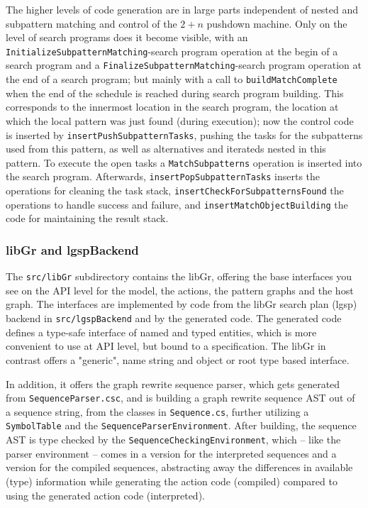 The higher levels of code generation are in large parts independent of nested and subpattern matching and control of the $2+n$ pushdown machine.
Only on the level of search programs does it become visible,  
with an \texttt{Initialize\-Subpattern\-Matching}-search program operation at the begin of a search program
and a \texttt{Finalize\-Subpattern\-Matching}-search program operation at the end of a search program;
but mainly with a call to \texttt{build\-Match\-Complete} when the end of the schedule is reached during search program building.
This corresponds to the innermost location in the search program,
the location at which the local pattern was just found (during execution);
now the control code is inserted by \texttt{insert\-Push\-Subpattern\-Tasks},
pushing the tasks for the subpatterns used from this pattern, as well as alternatives and iterateds nested in this pattern.
To execute the open tasks a \texttt{Match\-Subpatterns} operation is inserted into the search program. 
Afterwards, \texttt{insert\-Pop\-Subpattern\-Tasks} inserts the operations for cleaning the task stack,
\texttt{insert\-Check\-For\-Subpatterns\-Found} the operations to handle success and failure, 
and \texttt{insert\-Match\-Object\-Building} the code for maintaining the result stack.


\subsubsection*{libGr and lgspBackend}

The \texttt{src/libGr} subdirectory contains the libGr, offering the base interfaces you see on the API level for the model, the actions, the pattern graphs and the host graph.
The interfaces are implemented by code from the libGr search plan (lgsp) backend in \texttt{src/lgspBackend} and by the generated code.
The generated code defines a type-safe interface of named and typed entities, which is more convenient to use at API level, but bound to a specification.
The libGr in contrast offers a "generic", name string and object or root type based interface.

In addition, it offers the graph rewrite sequence parser, which gets generated from \texttt{Sequence\-Parser.csc},
and is building a graph rewrite sequence AST out of a sequence string, from the classes in \texttt{Sequence.cs}, further utilizing a \texttt{Symbol\-Table} and the \texttt{Sequence\-Parser\-Environment}.
After building, the sequence AST is type checked by the \texttt{Sequence\-Checking\-Environment}, which -- like the parser environment -- comes in a version for the interpreted sequences and a version for the compiled sequences, abstracting away the differences in available (type) information while generating the action code (compiled) compared to using the generated action code (interpreted).

